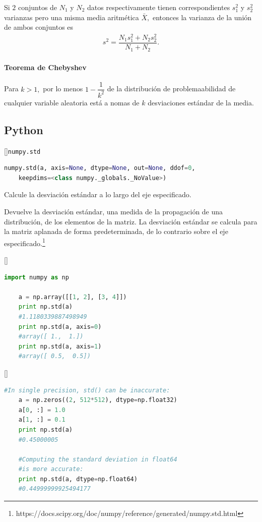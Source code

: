 Si $2$ conjuntos de $N_{1}$ y $N_{2}$ datos respectivamente tienen correspondientes $s_{1}^{2}$ y $s_{2}^{2}$ varianzas pero una misma media aritmética $\bar{X},$ entonces la varianza de la unión de ambos conjuntos es
\begin{align}
	s^{2}=\dfrac{N_{1}s_{1}^{2}+N_{2}s_{2}^{2}}{N_{1}+N_{2}}.
\end{align}

\paragraph{Teorema de Chebyshev}
Para $k>1,$ por lo menos $1-\dfrac{1}{k^{2}}$ de la distribución de problemaabilidad de cualquier variable aleatoria está a nomas  de $k$ desviaciones estándar de la media.

\subsection{Python}
[]{\texttt{numpy.std}}
\begin{lstlisting}[language=Python]
	numpy.std(a, axis=None, dtype=None, out=None, ddof=0,
	keepdims=<class numpy._globals._NoValue>)
\end{lstlisting}

Calcule la desviación estándar a lo largo del eje especificado.

Devuelve la desviación estándar, una medida de la propagación de una distribución, de los elementos de la matriz. La desviación estándar se calcula para la matriz aplanada de forma predeterminada, de lo contrario sobre el eje especificado.\footnote{https://docs.scipy.org/doc/numpy/reference/generated/numpy.std.html}

[]
\begin{lstlisting}[language=Python]
	import numpy as np
	
	a = np.array([[1, 2], [3, 4]])
	print np.std(a)
	#1.1180339887498949
	print np.std(a, axis=0)
	#array([ 1.,  1.])
	print np.std(a, axis=1)
	#array([ 0.5,  0.5])
\end{lstlisting}


[]
\begin{lstlisting}[language=Python]
	#In single precision, std() can be inaccurate:
	a = np.zeros((2, 512*512), dtype=np.float32)
	a[0, :] = 1.0
	a[1, :] = 0.1
	print np.std(a)
	#0.45000005
	
	#Computing the standard deviation in float64
	#is more accurate:
	print np.std(a, dtype=np.float64)
	#0.44999999925494177
\end{lstlisting}





